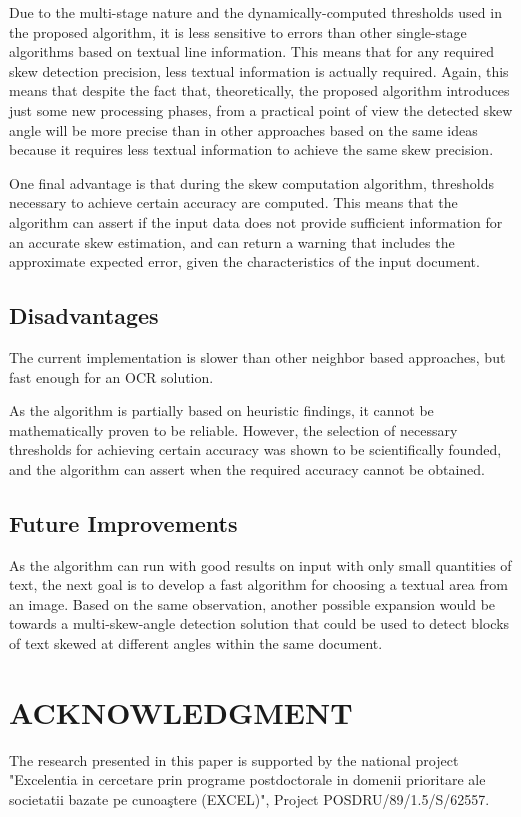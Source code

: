 \documentclass[10pt,a4paper]{article}
\begin{document}
	Due to the multi-stage nature and the dynamically-computed thresholds used in the proposed algorithm, it is less sensitive to errors than other single-stage algorithms based on textual line information. This means that for any required skew detection precision, less textual information is actually required. Again, this means that despite the fact that, theoretically, the proposed algorithm introduces just some new processing phases, from a practical point of view the detected skew angle will be more precise than in other approaches based on the same ideas because it requires less textual information to achieve the same skew precision.
	
	One final advantage is that during the skew computation algorithm, thresholds necessary to achieve certain accuracy are computed. This means that the algorithm can assert if the input data does not provide sufficient information for an accurate skew estimation, and can return a warning that includes the approximate expected error, given the characteristics of the input document.
	
	\subsection{Disadvantages}
	The current implementation is slower than other neighbor based approaches, but fast enough for an OCR solution.
	
	As the algorithm is partially based on heuristic findings, it cannot be mathematically proven to be reliable. However, the selection of necessary thresholds for achieving certain accuracy was shown to be scientifically founded, and the algorithm can assert when the required accuracy cannot be obtained.
	
	\subsection{Future Improvements}
	As the algorithm can run with good results on input with only small quantities of text, the next goal is to develop a fast algorithm for choosing a textual area from an image. Based on the same observation, another possible expansion would be towards a multi-skew-angle detection solution that could be used to detect blocks of text skewed at different angles within the same document.
	
	\section*{ACKNOWLEDGMENT}
	The research presented in this paper is supported by the national project "Excelentia in cercetare prin programe postdoctorale in domenii prioritare ale societatii bazate pe cunoaştere (EXCEL)", Project POSDRU/89/1.5/S/62557.
	
	
	
	
\end{document}
